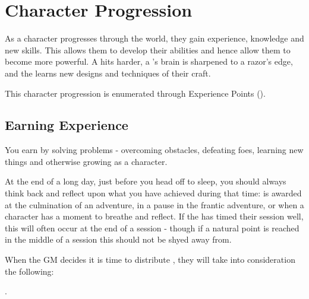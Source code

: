 
\chapter{Character Progression} \label{S:Progression}

	
	As a character progresses through the world, they gain experience, knowledge and new skills. This allows them to develop their abilities and hence allow them to become more powerful. A  hits harder, a 's brain is sharpened to a razor's edge, and the  learns new designs and techniques of their craft. 
	
	This character progression is enumerated through {\imp Experience Points} (). 
	
	\section{Earning Experience}
	
	You earn  by solving problems - overcoming obstacles, defeating foes, learning new things and otherwise growing as a character. 
	
	At the end of a long day, just before you head off to sleep, you should always think back and reflect upon what you have achieved during that time:  is awarded at the culmination of an adventure, in a pause in the frantic adventure, or when a character has a moment to breathe and reflect. If the  has timed their session well, this will often occur at the end of a session - though if a natural point is reached in the middle of a session this should not be shyed away from. 
	
	When the GM decides it is time to distribute , they will take into consideration the following:
	\begin{itemize}
		. 
	\end{itemize}
	
